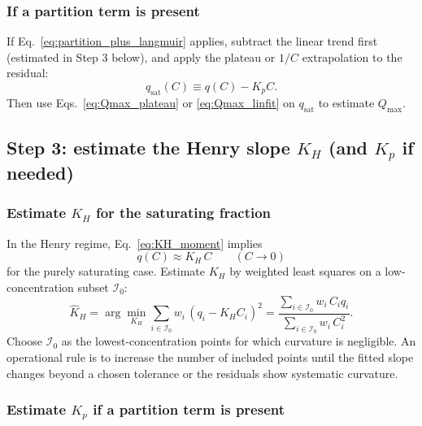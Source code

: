 \documentclass[12pt]{article}
\begin{document}
	\subsubsection{If a partition term is present}
	
	If Eq.~\eqref{eq:partition_plus_langmuir} applies, subtract the linear trend first (estimated in Step 3 below), and apply the plateau or $1/C$ extrapolation to the residual:
	\[
	q_{\mathrm{sat}}(C) \equiv q(C) - K_p C.
	\]
	Then use Eqs.~\eqref{eq:Qmax_plateau} or \eqref{eq:Qmax_linfit} on $q_{\mathrm{sat}}$ to estimate $Q_{\max}$.
	
	\subsection{Step 3: estimate the Henry slope $K_H$ (and $K_p$ if needed)}
	
	\subsubsection{Estimate $K_H$ for the saturating fraction}
	
	In the Henry regime, Eq.~\eqref{eq:KH_moment} implies
	\begin{equation}
		q(C) \approx K_H\,C
		\qquad (C \to 0)
		\label{eq:henry_local}
	\end{equation}
	for the purely saturating case. Estimate $K_H$ by weighted least squares on a low-concentration subset $\mathcal{I}_0$:
	\begin{equation}
		\widehat{K}_H =
		\arg\min_{K_H}\sum_{i\in\mathcal{I}_0} w_i\,(q_i - K_H C_i)^2
		=
		\frac{\sum_{i\in\mathcal{I}_0} w_i\,C_i q_i}{\sum_{i\in\mathcal{I}_0} w_i\,C_i^2}.
		\label{eq:KH_fit}
	\end{equation}
	Choose $\mathcal{I}_0$ as the lowest-concentration points for which curvature is negligible. An operational rule is to increase the number of included points until the fitted slope changes beyond a chosen tolerance or the residuals show systematic curvature.
	
	\subsubsection{Estimate $K_p$ if a partition term is present}
	
\end{document}
